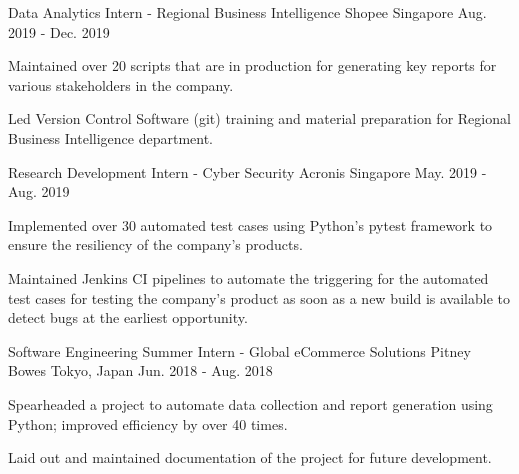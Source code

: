 \begin{cventries}
  \cventry
    {Data Analytics Intern - Regional Business Intelligence} %
    {Shopee} %
    {Singapore} %
    {Aug. 2019 - Dec. 2019} %
    {
      \begin{cvitems} %
        \item {Maintained over 20 scripts that are in production for generating key reports for various stakeholders in the company.}
        \item {Led Version Control Software (git) training and material preparation for Regional Business Intelligence department.}
      \end{cvitems}
    }

  \cventry
    {Research Development Intern - Cyber Security} %
    {Acronis} %
    {Singapore} %
    {May. 2019 - Aug. 2019} %
    {
      \begin{cvitems} %
        \item {Implemented over 30 automated test cases using Python’s pytest framework to ensure the resiliency of the company’s products.}
        \item {Maintained Jenkins CI pipelines to automate the triggering for the automated test cases for testing the company’s product as soon as a new build is available to detect bugs at the earliest opportunity.}
      \end{cvitems}
    }

  \cventry
    {Software Engineering Summer Intern - Global eCommerce Solutions} %
    {Pitney Bowes} %
    {Tokyo, Japan} %
    {Jun. 2018 - Aug. 2018} %
    {
      \begin{cvitems} %
        \item {Spearheaded a project to automate data collection and report generation using Python; improved efficiency by over 40 times.}
        \item {Laid out and maintained documentation of the project for future development.}
      \end{cvitems}
    }

\end{cventries}
